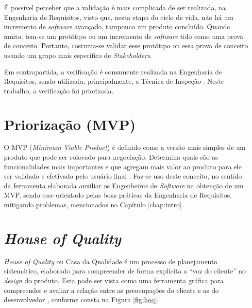 É possível perceber que a validação é mais complicada de ser realizada, na Engenharia de Requisitos, visto que, nesta etapa do ciclo de vida, não há um incremento de \textit{software} avançado, tampouco um produto concluído. Quando muito, tem-se um protótipo ou um incremento de \textit{software} tido como uma prova de conceito. Portanto, costuma-se validar esse protótipo ou essa prova de conceito usando um grupo mais específico de \textit{Stakeholders}.

Em contrapartida, a verificação é comumente realizada na Engenharia de Requisitos, sendo utilizada, principalmente, a Técnica de Inspeção \cite{design_fagan} \cite{verification_MR}. Neste trabalho, a verificação foi priorizada.

\section{Priorização (MVP)}

\label{sec:priorizacao}

O MVP (\textit{Minimum Viable Product}) é definido como a versão mais simples de um produto que pode ser colocado para negociação. Determina quais são as funcionalidades mais importantes e que agregam mais valor ao produto para ele ser validado e efetivado pelo usuário final \cite{carolipaulo2018}. Faz-se uso deste conceito, no sentido da ferramenta elaborada auxiliar os Engenheiros de \textit{Software} na obtenção de um MVP, sendo esse orientado pelas boas práticas da Engenharia de Requisitos, mitigando problemas, mencionados no Capítulo \ref{chap:intro}.

\section{\textit{House of Quality}}

\label{sec:house_of_quality}

\textit{House of Quality} ou Casa da Qualidade é um processo de planejamento sistemático, elaborado para compreender de forma explícita a “voz do cliente” no \textit{design} do produto. Esta pode ser vista como uma ferramenta gráfica para compreender e avaliar a relação entre as preocupações do cliente e as do desenvolvedor \cite{Howard_1}, conforme consta na Figura \ref{fig:hoq}.

